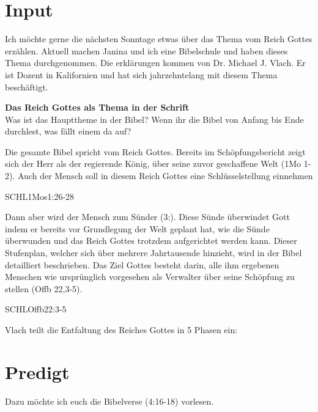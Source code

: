 \documentclass{../../inc/mybib}
\begin{document}
\section{ Input }
\begin{spacing}{1.5}    
  \begin{block}[Einleitung]
    Ich möchte gerne die nächsten Sonntage etwas über das Thema vom Reich Gottes erzählen. Aktuell machen Janina und ich eine Bibelschule und haben dieses Thema durchgenommen. Die erklärungen kommen von Dr. Michael J. Vlach. Er ist Dozent in Kalifornien und hat sich jahrzehntelang mit diesem Thema beschäftigt.
    
  \end{block}
  
   \textbf{Das Reich Gottes als Thema in der Schrift}\\
   Was ist das Haupttheme in der Bibel? Wenn ihr die Bibel von Anfang bis Ende durchlest, was fällt einem da auf?

   Die gesamte Bibel spricht vom Reich Gottes. Bereits im Schöpfungsbericht zeigt sich der
   Herr als der regierende König, über seine zuvor geschaffene Welt (1Mo 1-2). Auch der
   Mensch soll in diesem Reich Gottes eine Schlüsselstellung einnehmen   
    \begin{bibelbox}{SCHL}{1Mos}{1:26-28}

    \end{bibelbox}
   Dann aber wird der Mensch zum Sünder (3:). Diese Sünde überwindet Gott indem er
   bereits vor Grundlegung der Welt geplant hat, wie die Sünde überwunden und das Reich
   Gottes trotzdem aufgerichtet werden kann. Dieser Stufenplan, welcher sich über mehrere
   Jahrtausende hinzieht, wird in der Bibel detailliert beschrieben.
   Das Ziel Gottes besteht darin, alle ihm ergebenen Menschen wie ursprünglich
   vorgesehen als Verwalter über seine Schöpfung zu stellen (Offb 22,3-5).
   \begin{bibelbox}{SCHL}{Offb}{22:3-5}

   \end{bibelbox}
   Vlach teilt die Entfaltung des Reiches Gottes in 5 Phasen ein:
   
\end{spacing}

\section{Predigt}

Dazu möchte ich euch die Bibelverse (4:16-18) vorlesen.
\end{document}
